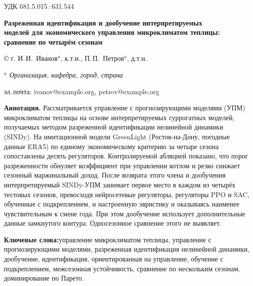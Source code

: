 \documentclass[12pt,a4paper,leqno]{article}
\begin{document}
\begin{flushleft}
\small УДК 681.5.015\,:\,631.544
\end{flushleft}

\begin{center}
{\LARGE\bfseries Разреженная идентификация и дообучение интерпретируемых\\[2pt]
моделей для экономического управления микроклиматом теплицы:\\[2pt]
сравнение по четырём сезонам\par}

\vspace{6mm}
{\large ©  г.\quad
И.\,И.~Иванов$^{a}$, к.т.н., \;П.\,П.~Петров$^{a}$, д.т.н.\par}

\vspace{3mm}
{\itshape $^{a}$ Организация, кафедра, город, страна\par}
{\small эл.\,почта: ivanov@example.org, petrov@example.org\par}
\end{center}

\vspace{3mm}
\noindent\textbf{Аннотация.}\enspace
Рассматривается управление с прогнозирующими моделями (УПМ) микроклиматом теплицы на
основе интерпретируемых суррогатных моделей, получаемых методом разреженной
идентификации нелинейной динамики (SINDy). На имитационной модели GreenLight
(Ростов-на-Дону, погодные данные ERA5) по единому экономическому критерию за четыре
сезона сопоставлены десять регуляторов. Контролируемой абляцией показано, что порог
разреженности обнуляет коэффициент при управлении котлом и резко снижает сезонный
маржинальный доход. После возврата этого члена и дообучения интерпретируемый SINDy-УПМ занимает первое
место в каждом из четырёх тестовых сезонов, превосходя нейросетевые регуляторы,
регуляторы PPO и SAC, обученные с подкреплением, и настроенную эвристику и оказываясь
наименее чувствительным к смене года. При этом дообучение использует дополнительные данные
замкнутого контура.
Односезонное сравнение этого не выявляет.

\vspace{2mm}
\noindent\textbf{Ключевые слова:}\enspace управление микроклиматом теплицы,
управление с прогнозирующими моделями, разреженная идентификация нелинейной
динамики, дообучение, идентификация, ориентированная на управление, обучение с
подкреплением, межсезонная устойчивость, сравнение по нескольким сезонам,
доминирование по Парето.
\end{document}
